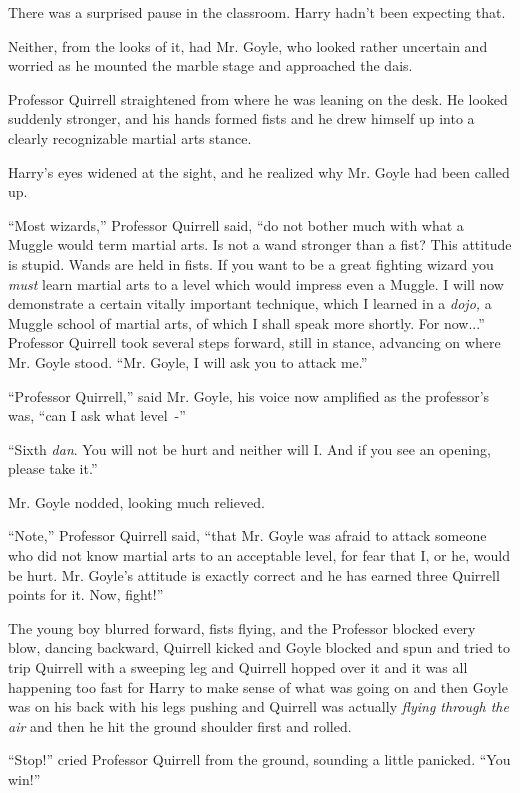 There was a surprised pause in the classroom. Harry hadn't been expecting that.

Neither, from the looks of it, had Mr. Goyle, who looked rather uncertain and worried as he mounted the marble stage and approached the dais.

Professor Quirrell straightened from where he was leaning on the desk. He looked suddenly stronger, and his hands formed fists and he drew himself up into a clearly recognizable martial arts stance.

Harry's eyes widened at the sight, and he realized why Mr. Goyle had been called up.

``Most wizards,'' Professor Quirrell said, ``do not bother much with what a Muggle would term martial arts. Is not a wand stronger than a fist? This attitude is stupid. Wands are held in fists. If you want to be a great fighting wizard you \emph{must} learn martial arts to a level which would impress even a Muggle. I will now demonstrate a certain vitally important technique, which I learned in a \emph{dojo,} a Muggle school of martial arts, of which I shall speak more shortly. For now...'' Professor Quirrell took several steps forward, still in stance, advancing on where Mr. Goyle stood. ``Mr. Goyle, I will ask you to attack me.''

``Professor Quirrell,'' said Mr. Goyle, his voice now amplified as the professor's was, ``can I ask what level~-''

``Sixth \emph{dan}. You will not be hurt and neither will I. And if you see an opening, please take it.''

Mr. Goyle nodded, looking much relieved.

``Note,'' Professor Quirrell said, ``that Mr. Goyle was afraid to attack someone who did not know martial arts to an acceptable level, for fear that I, or he, would be hurt. Mr. Goyle's attitude is exactly correct and he has earned three Quirrell points for it. Now, fight!''

The young boy blurred forward, fists flying, and the Professor blocked every blow, dancing backward, Quirrell kicked and Goyle blocked and spun and tried to trip Quirrell with a sweeping leg and Quirrell hopped over it and it was all happening too fast for Harry to make sense of what was going on and then Goyle was on his back with his legs pushing and Quirrell was actually \emph{flying through the air} and then he hit the ground shoulder first and rolled.

``Stop!'' cried Professor Quirrell from the ground, sounding a little panicked. ``You win!''

